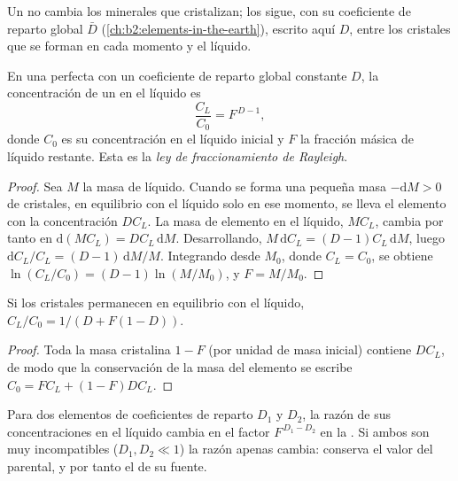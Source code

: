 Un  no cambia los minerales que cristalizan; los sigue,
con su coeficiente de reparto global $\bar D$ (\cref{ch:b2:elements-in-the-earth}),
escrito aquí $D$, entre los cristales que se forman en cada momento y el líquido.

\begin{theorem}\label{thm:b2:magmatic-differentiation:rayleigh}
En una  perfecta con un coeficiente de reparto global constante
$D$, la concentración de un  en el líquido es
\[
\frac{C_L}{C_0} = F^{\,D-1},
\]
donde $C_0$ es su concentración en el líquido inicial y $F$ la fracción másica de
líquido restante. Esta es la
\emph{ley de fraccionamiento de Rayleigh}.
\end{theorem}

\begin{proof}
Sea $M$ la masa de líquido. Cuando se forma una pequeña masa $-\mathrm dM > 0$ de cristales,
en equilibrio con el líquido solo en ese momento, se lleva el elemento con
la concentración $DC_L$. La masa de elemento en el líquido, $MC_L$, cambia por tanto
en $\mathrm d(MC_L) = DC_L\,\mathrm dM$. Desarrollando, $M\,\mathrm dC_L = (D-1)C_L\,
\mathrm dM$, luego $\mathrm dC_L/C_L = (D-1)\,\mathrm dM/M$. Integrando desde $M_0$,
donde $C_L = C_0$, se obtiene $\ln(C_L/C_0) = (D-1)\ln(M/M_0)$, y $F = M/M_0$.
\end{proof}

\begin{proposition}
\label{prop:b2:magmatic-differentiation:equilibrium}
Si los cristales permanecen en equilibrio con el líquido, $C_L/C_0 = 1/(D + F(1-D))$.
\end{proposition}

\begin{proof}
Toda la masa cristalina $1-F$ (por unidad de masa inicial) contiene $DC_L$, de modo que la
conservación de la masa del elemento se escribe $C_0 = FC_L + (1-F)DC_L$.
\end{proof}

\begin{corollary}\label{cor:b2:magmatic-differentiation:ratio}
Para dos elementos de coeficientes de reparto $D_1$ y $D_2$, la razón de sus
concentraciones en el líquido cambia en el factor $F^{\,D_1-D_2}$ en la . Si ambos son muy incompatibles ($D_1, D_2 \ll 1$) la razón
apenas cambia: conserva el valor del  parental, y por tanto el de su fuente.
\end{corollary}

